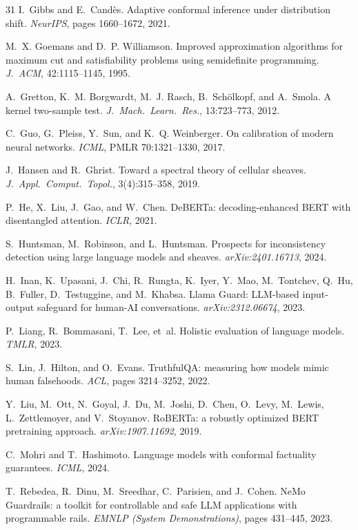 \begin{thebibliography}{31}
 I.~Gibbs and E.~Cand\`es. Adaptive conformal inference
under distribution shift. \emph{NeurIPS}, pages 1660--1672, 2021.

 M.~X. Goemans and D.~P. Williamson. Improved
approximation algorithms for maximum cut and satisfiability problems using
semidefinite programming. \emph{J.\ ACM}, 42:1115--1145, 1995.

 A.~Gretton, K.~M. Borgwardt, M.~J. Rasch,
B.~Sch\"olkopf, and A.~Smola. A kernel two-sample test. \emph{J.\ Mach.\
Learn.\ Res.}, 13:723--773, 2012.

 C.~Guo, G.~Pleiss, Y.~Sun, and K.~Q. Weinberger. On
calibration of modern neural networks. \emph{ICML}, PMLR 70:1321--1330, 2017.

 J.~Hansen and R.~Ghrist. Toward a spectral theory of
cellular sheaves. \emph{J.\ Appl.\ Comput.\ Topol.}, 3(4):315--358, 2019.

 P.~He, X.~Liu, J.~Gao, and W.~Chen. DeBERTa:
decoding-enhanced BERT with disentangled attention. \emph{ICLR}, 2021.

 S.~Huntsman, M.~Robinson, and L.~Huntsman. Prospects
for inconsistency detection using large language models and sheaves.
\emph{arXiv:2401.16713}, 2024.

 H.~Inan, K.~Upasani, J.~Chi, R.~Rungta, K.~Iyer, Y.~Mao,
M.~Tontchev, Q.~Hu, B.~Fuller, D.~Testuggine, and M.~Khabsa. Llama Guard:
LLM-based input-output safeguard for human-AI conversations.
\emph{arXiv:2312.06674}, 2023.

 P.~Liang, R.~Bommasani, T.~Lee, et~al. Holistic
evaluation of language models. \emph{TMLR}, 2023.

 S.~Lin, J.~Hilton, and O.~Evans. TruthfulQA: measuring how
models mimic human falsehoods. \emph{ACL}, pages 3214--3252, 2022.

 Y.~Liu, M.~Ott, N.~Goyal, J.~Du, M.~Joshi, D.~Chen,
O.~Levy, M.~Lewis, L.~Zettlemoyer, and V.~Stoyanov. RoBERTa: a robustly
optimized BERT pretraining approach. \emph{arXiv:1907.11692}, 2019.

 C.~Mohri and T.~Hashimoto. Language models with conformal
factuality guarantees. \emph{ICML}, 2024.

 T.~Rebedea, R.~Dinu, M.~Sreedhar, C.~Parisien, and
J.~Cohen. NeMo Guardrails: a toolkit for controllable and safe LLM
applications with programmable rails. \emph{EMNLP (System Demonstrations)},
pages 431--445, 2023.


\end{thebibliography}

